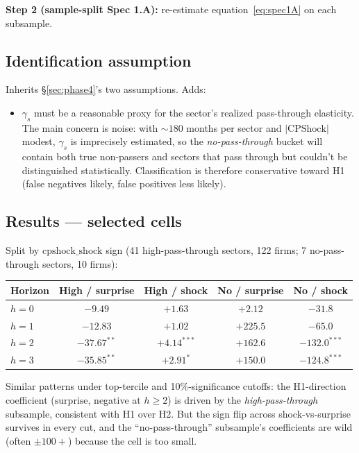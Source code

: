 \documentclass[11pt]{article}
\begin{document}
\textbf{Step 2 (sample-split Spec 1.A):} re-estimate equation~\eqref{eq:spec1A} on each subsample.

\subsection{Identification assumption}

Inherits \S\ref{sec:phase4}'s two assumptions. Adds:
\begin{itemize}
  \item $\gamma_s$ must be a reasonable proxy for the sector's realized pass-through elasticity. The main concern is noise: with $\sim 180$ months per sector and $|\mathrm{CPShock}|$ modest, $\gamma_s$ is imprecisely estimated, so the \emph{no-pass-through} bucket will contain both true non-passers and sectors that pass through but couldn't be distinguished statistically. Classification is therefore conservative toward H1 (false negatives likely, false positives less likely).
\end{itemize}

\subsection{Results --- selected cells}

Split by $\mathrm{cpshock\_shock}$ sign (41 high-pass-through sectors, 122 firms; 7 no-pass-through sectors, 10 firms):

\begin{center}
\begin{tabular}{lcccc}
\toprule
Horizon & High / surprise & High / shock & No / surprise & No / shock \\
\midrule
$h=0$ & $-9.49$        & $+1.63$       & $+2.12$  & $-31.8$ \\
$h=1$ & $-12.83$       & $+1.02$       & $+225.5$ & $-65.0$ \\
$h=2$ & $\mathbf{-37.67^{**}}$ & $\mathbf{+4.14^{***}}$ & $+162.6$ & $\mathbf{-132.0^{***}}$ \\
$h=3$ & $\mathbf{-35.85^{**}}$ & $\mathbf{+2.91^{*}}$   & $+150.0$ & $\mathbf{-124.8^{***}}$ \\
\bottomrule
\end{tabular}
\end{center}

Similar patterns under top-tercile and 10\%-significance cutoffs: the H1-direction coefficient ($\mathrm{surprise}$, negative at $h \geq 2$) is driven by the \emph{high-pass-through} subsample, consistent with H1 over H2. But the sign flip across shock-vs-surprise survives in every cut, and the ``no-pass-through'' subsample's coefficients are wild (often $\pm 100+$) because the cell is too small.
\end{document}
